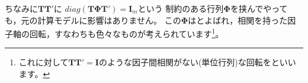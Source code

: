 \documentclass{ltjsbook}
\begin{document}
ちなみに$\bm{TT'}$に
$diag(\bm{T\Phi T'})=\bm{I}_m$という
制約のある行列$\bm{\Phi}$を挟んでやっても，元の計算モデルに影響はありません。
この$\bm{\Phi}$はとよばれ，相関を持った因子軸の回転，すなわちも色々なものが考えられています\footnote{これに対して$\bm{TT'}=\bm{I}$のような因子間相関がない(単位行列)な回転をといいます。}。
\end{document}
